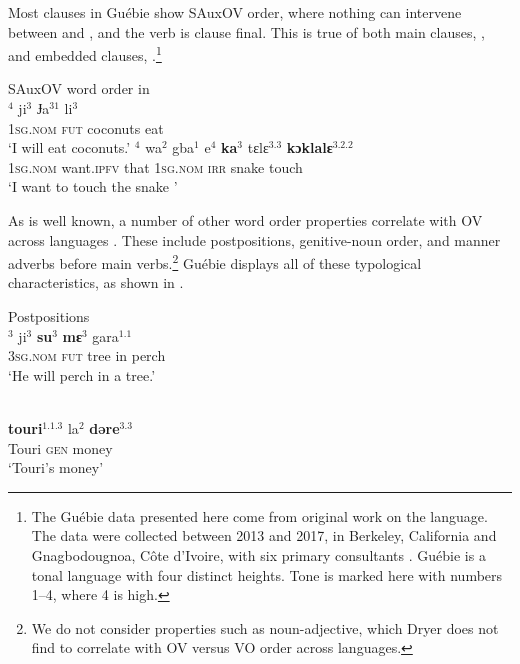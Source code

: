 \documentclass[output=paper,newtxmath,modfonts,nonflat,draftmode]{langsci/langscibook}
\begin{document}
Most clauses in Guébie show SAuxOV order, where nothing can intervene between  and , and the verb is clause final. This is true of both main clauses, , and embedded clauses, .\footnote{The Guébie data presented here come from original work on the language. The data were collected between 2013 and 2017, in Berkeley, California and Gnagbodougnoa, Côte d'Ivoire, with six primary consultants \citep[cf.][]{Sande:2017}. Guébie is a tonal language with four distinct  heights. Tone is marked here with numbers 1--4, where 4 is high.}

\ea 
\ea SAuxOV word order in \\ 
$^{4}$ {ji}$^{3}$ {Ɉa}$^{31}$ {li}$^{3}$  \\
\textsc{1sg}.\textsc{nom} \textsc{fut} coconuts eat \\
\glt `I will eat coconuts.'  \label{ex:sande:3a}
\ex {}$^{4}$ {wa}$^{2}$ {gba}$^{1}$ {e}$^{4}$ \textbf{{ka}$^{3}$} {tɛlɛ}$^{3.3}$ \textbf{{kɔklalɛ}$^{3.2.2}$} \\
\textsc{1sg}.\textsc{nom} want.\textsc{ipfv} that \textsc{1sg}.\textsc{nom} \textsc{irr} snake touch \\
\glt `I want to touch the snake ' \label{ex:sande:3b}
\z
\z


As is well known, a number of other word order properties correlate with OV across languages \citep{Greenberg:1963, dryer07}. These include postpositions, genitive-noun order, and manner adverbs before main verbs.\footnote{We do not consider properties such as noun-adjective, which Dryer does not find to correlate with OV versus VO order across languages.} Guébie displays all of these typological characteristics, as shown in .

\ea {} \label{ex:4:Guebie} 
\ea Postpositions\\
$^{3}$ {ji}$^{3}$ \textbf{{su}$^{3}$} \textbf{{mɛ}$^{3}$} {gara}$^{1.1}$ \\
\textsc{3sg}.\textsc{nom} \textsc{fut} tree in perch\\
\glt  `He will perch in a tree.' 

\\
\gll \textbf{{touri}$^{1.1.3}$} {la}$^{2}$ \textbf{{dəre}$^{3.3}$}\\
Touri \textsc{gen} money\\
\glt `Touri's money'
\end{document}
